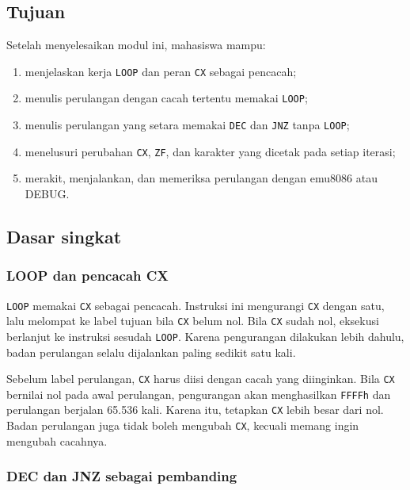 
\subsection{Tujuan}

\begin{tujuan}
Setelah menyelesaikan modul ini, mahasiswa mampu:
\begin{enumerate}
    \item menjelaskan kerja \texttt{LOOP} dan peran \texttt{CX}
          sebagai pencacah;
    \item menulis perulangan dengan cacah tertentu memakai
          \texttt{LOOP};
    \item menulis perulangan yang setara memakai \texttt{DEC} dan
          \texttt{JNZ} tanpa \texttt{LOOP};
    \item menelusuri perubahan \texttt{CX}, \texttt{ZF}, dan karakter
          yang dicetak pada setiap iterasi;
    \item merakit, menjalankan, dan memeriksa perulangan dengan
          emu8086 atau DEBUG.
\end{enumerate}
\end{tujuan}

\subsection{Dasar singkat}

\subsubsection*{LOOP dan pencacah CX}

\texttt{LOOP} memakai \texttt{CX} sebagai pencacah. Instruksi ini
mengurangi \texttt{CX} dengan satu, lalu melompat ke label tujuan
bila \texttt{CX} belum nol. Bila \texttt{CX} sudah nol, eksekusi
berlanjut ke instruksi sesudah \texttt{LOOP}. Karena pengurangan
dilakukan lebih dahulu, badan perulangan selalu dijalankan paling
sedikit satu kali.

Sebelum label perulangan, \texttt{CX} harus diisi dengan cacah yang
diinginkan. Bila \texttt{CX} bernilai nol pada awal perulangan,
pengurangan akan menghasilkan \texttt{FFFFh} dan perulangan berjalan
65.536 kali. Karena itu, tetapkan \texttt{CX} lebih besar dari nol.
Badan perulangan juga tidak boleh mengubah \texttt{CX}, kecuali
memang ingin mengubah cacahnya.

\subsubsection*{DEC dan JNZ sebagai pembanding}

